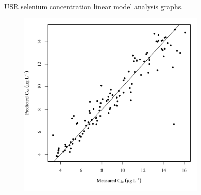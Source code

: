 \begin{linenumbers}
\begin{landscape}
\begin{figure}
\begin{subfigure}{0.7\textwidth}
		\end{subfigure}\\
		\caption{USR selenium concentration linear model analysis graphs.}
	\end{figure}
\end{landscape}

\subfiguremid
\begin{landscape}
	\begin{figure}
		\begin{subfigure}{0.7\textwidth}
			\centering
			\includegraphics[width=\tableCustomSize]{"Figures/Results_USR/Stochastic/Conc Model pred v meas UDIV"}
		\end{subfigure}%
		\begin{subfigure}{0.7\textwidth}
			\centering

\end{subfigure}
\end{figure}
\end{landscape}
\end{linenumbers}
